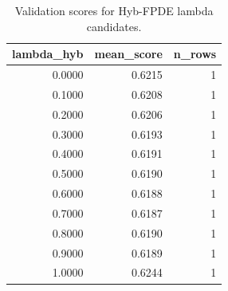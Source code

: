\begin{table}[t]
\caption{Validation scores for Hyb-FPDE lambda candidates.}
\label{tab:lambda_distribution_computed}
\centering
\begin{tabular}{rrr}
\toprule
lambda\_hyb & mean\_score & n\_rows \\
\midrule
0.0000 & 0.6215 & 1 \\
0.1000 & 0.6208 & 1 \\
0.2000 & 0.6206 & 1 \\
0.3000 & 0.6193 & 1 \\
0.4000 & 0.6191 & 1 \\
0.5000 & 0.6190 & 1 \\
0.6000 & 0.6188 & 1 \\
0.7000 & 0.6187 & 1 \\
0.8000 & 0.6190 & 1 \\
0.9000 & 0.6189 & 1 \\
1.0000 & 0.6244 & 1 \\
\bottomrule
\end{tabular}

\end{table}
